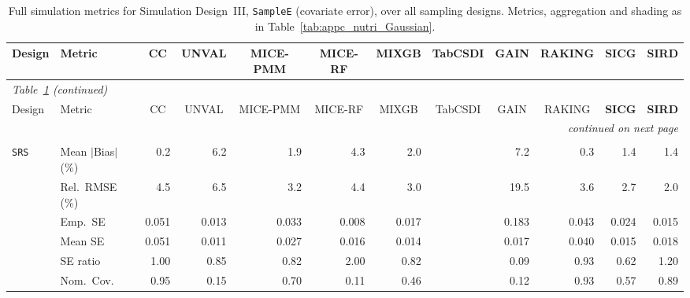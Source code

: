 \begin{landscape}
\footnotesize\setlength{\tabcolsep}{3.5pt}
\begin{longtable}{llrrrrrrrrrr}
\caption{Full simulation metrics for Simulation Design~III, \texttt{SampleE} (covariate error), over all sampling designs. Metrics, aggregation and shading as in Table~\ref{tab:appc_nutri_Gaussian}.}
\label{tab:appc_surv_SampleE} \\
\toprule
Design & Metric & \multicolumn{1}{c}{CC} & \multicolumn{1}{c}{UNVAL} & \multicolumn{1}{c}{MICE-PMM} & \multicolumn{1}{c}{MICE-RF} & \multicolumn{1}{c}{MIXGB} & \multicolumn{1}{c}{TabCSDI} & \multicolumn{1}{c}{GAIN} & \multicolumn{1}{c}{RAKING} & \multicolumn{1}{c}{\textbf{SICG}} & \multicolumn{1}{c}{\textbf{SIRD}} \\
\midrule
\endfirsthead
\multicolumn{12}{l}{\footnotesize\itshape Table~\ref{tab:appc_surv_SampleE} (continued)} \\
\toprule
Design & Metric & \multicolumn{1}{c}{CC} & \multicolumn{1}{c}{UNVAL} & \multicolumn{1}{c}{MICE-PMM} & \multicolumn{1}{c}{MICE-RF} & \multicolumn{1}{c}{MIXGB} & \multicolumn{1}{c}{TabCSDI} & \multicolumn{1}{c}{GAIN} & \multicolumn{1}{c}{RAKING} & \multicolumn{1}{c}{\textbf{SICG}} & \multicolumn{1}{c}{\textbf{SIRD}} \\
\midrule
\endhead
\midrule \multicolumn{12}{r}{\footnotesize\itshape continued on next page} \\
\endfoot
\bottomrule
\endlastfoot
\multicolumn{12}{l}{\textbf{Continuous Phase-Two Covariates}} \\
\addlinespace[2pt]
\quad \texttt{SRS} & Mean $|$Bias$|$ (\%) & \cellcolor{rankone}0.2 & 6.2 & 1.9 & 4.3 & 2.0 &  & 7.2 & \cellcolor{ranktwo}0.3 & \cellcolor{rankthree}1.4 & \cellcolor{rankthree}1.4 \\
 & Rel.\ RMSE (\%) & 4.5 & 6.5 & 3.2 & 4.4 & \cellcolor{rankthree}3.0 &  & 19.5 & 3.6 & \cellcolor{ranktwo}2.7 & \cellcolor{rankone}2.0 \\
 & Emp.\ SE & 0.051 & 0.013 & 0.033 & 0.008 & 0.017 &  & 0.183 & 0.043 & 0.024 & 0.015 \\
 & Mean SE & 0.051 & 0.011 & 0.027 & 0.016 & 0.014 &  & 0.017 & 0.040 & 0.015 & 0.018 \\
 & SE ratio & \cellcolor{rankone}1.00 & \cellcolor{rankthree}0.85 & 0.82 & 2.00 & 0.82 &  & 0.09 & \cellcolor{ranktwo}0.93 & 0.62 & 1.20 \\
 & Nom.\ Cov. & \cellcolor{rankone}0.95 & 0.15 & 0.70 & 0.11 & 0.46 &  & 0.12 & \cellcolor{ranktwo}0.93 & 0.57 & \cellcolor{rankthree}0.89 \\

\end{longtable}
\end{landscape}
